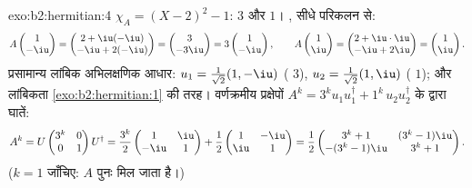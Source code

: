 \begin{solution}{exo:b2:hermitian:4}
$\chi_A = (X-2)^2 - 1$:  $3$ और $1$। , सीधे परिकलन से:
\[
A\begin{pmatrix}1\\ -\iu\end{pmatrix}
= \begin{pmatrix} 2 + \iu(-\iu)\\ -\iu + 2(-\iu)\end{pmatrix}
= \begin{pmatrix} 3\\ -3\iu \end{pmatrix}
= 3\begin{pmatrix}1\\ -\iu\end{pmatrix},
\qquad
A\begin{pmatrix}1\\ \iu\end{pmatrix}
= \begin{pmatrix} 2 + \iu\cdot\iu\\ -\iu + 2\iu\end{pmatrix}
= \begin{pmatrix}1\\ \iu\end{pmatrix}.
\]
प्रसामान्य लांबिक अभिलक्षणिक आधार: $u_1 = \frac{1}{\sqrt2}(1, -\iu)$ ( $3$), $u_2 = \frac{1}{\sqrt2}(1, \iu)$
( $1$); और लांबिकता \cref{exo:b2:hermitian:1} की तरह। वर्णक्रमीय प्रक्षेपों $A^k = 3^k u_1u_1^\dagger + 1^k\,
u_2u_2^\dagger$
के द्वारा घातें:
\[
A^k = U\begin{pmatrix} 3^k & 0\\ 0 & 1\end{pmatrix}U^\dagger
= \frac{3^k}{2}\begin{pmatrix} 1 & \iu\\ -\iu & 1\end{pmatrix}
+ \frac{1}{2}\begin{pmatrix} 1 & -\iu\\ \iu & 1\end{pmatrix}
= \frac12\begin{pmatrix}
3^k + 1 & (3^k - 1)\iu\\
-(3^k-1)\iu & 3^k + 1
\end{pmatrix}.
\]
($k = 1$ जाँचिए: $A$ पुनः मिल जाता है।)
\end{solution}

